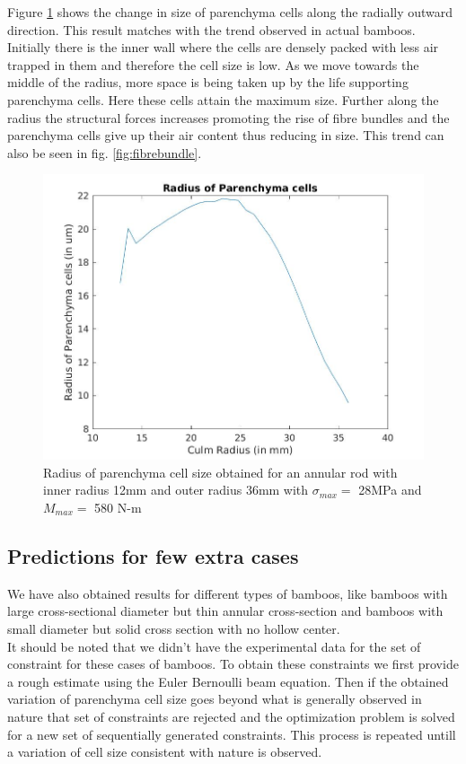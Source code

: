 \documentclass[openright,twoside]{iitkthesis}
\begin{document}
Figure \ref{fig:cellsize} shows the change in size of parenchyma cells along the radially outward direction. This result matches with the trend observed in actual bamboos. Initially there is the inner wall where the cells are densely packed with less air trapped in them and therefore the cell size is low. As we move towards the middle of the radius, more space is being taken up by the life supporting parenchyma cells. Here these cells attain the maximum size. Further along the radius the structural forces increases promoting the rise of fibre bundles and the parenchyma cells give up their air content thus reducing in size. This trend can also be seen in fig. \ref{fig:fibrebundle}.
\begin{figure}[H]
\begin{center}
	\includegraphics[scale=0.3]{./Plots/normal/b77.jpg}
	\caption{Radius of parenchyma cell size obtained for an annular rod with inner radius 12mm and outer radius 36mm with $\sigma_{max} = $ 28MPa and $M_{max} = $ 580 N-m}
\label{fig:cellsize}
\end{center}
\end{figure}

\subsection{Predictions for few extra cases}
We have also obtained results for different types of bamboos, like bamboos with large cross-sectional diameter but thin annular cross-section and bamboos with small diameter but solid cross section with no hollow center.\\
It should be noted that we didn't have the experimental data for the set of constraint for these cases of bamboos. To obtain these constraints we first provide a rough estimate using the Euler Bernoulli beam equation. Then if the obtained variation of parenchyma cell size goes beyond what is generally observed in nature that set of constraints are rejected and the optimization problem is solved for a new set of sequentially generated constraints. This process is repeated untill a variation of cell size consistent with nature is observed. 
\end{document}

